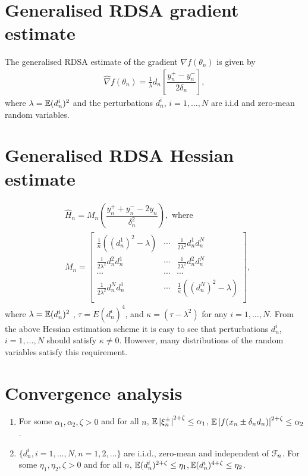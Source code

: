 \section{Generalised RDSA gradient estimate}
The generalised RDSA estimate of the gradient $\nabla f(\theta_n)$ is given by
\begin{align}
\label{eq:grad-gen}
\widehat\nabla f(\theta_n) = \frac1{\lambda} d_n \left[ \dfrac{y_n^+ - y_n^-}{2\delta_n}\right],
\end{align}
where $\lambda = \mathbb{E}(d_n^i)^2 $ and the perturbations $d_n^i$, $i=1,\ldots,N$ are i.i.d and zero-mean random variables. 

\section{Generalised RDSA Hessian estimate}
\begin{align}
\label{eq:2rdsa-estimate-gen}
&\widehat H_n = M_n \left(\dfrac{y_n^+ + y_n^- - 2 y_n}{\delta_n^2}\right), \text{ where }\\
& M_n =
\left[
\begin{array}{ccc}
\frac{1}{\kappa}\left((d_n^1)^2\!-\lambda\right) & \cdots & \frac{1}{2 \lambda^2}d_n^1 d_n^N\\
\frac{1}{2 \lambda^2}d_n^2 d_n^1  &  \cdots & \frac{1}{2 \lambda^2}d_n^2 d_n^N\\
\cdots&\cdots&\cdots\\
\frac{1}{2 \lambda^2}d_n^N d_n^1 & \cdots &  \frac{1}{\kappa}\left((d_n^N)^2-\lambda\right) \\
\end{array}
\right],\nonumber
\end{align}
where $\lambda = \mathbb{E}(d_n^i)^2 $ , $\tau = E (d_n^i)^4$, and $\kappa = \left(\tau - \lambda^2\right)$ for any $i=1,\ldots,N$.
From the above Hessian estimation scheme it is easy to see that perturbations $d_n^i$, $i=1,\ldots,N$ should satisfy  $\kappa \neq 0$. However, many distributions of the random variables satisfy this requirement. 

\section{Convergence analysis}
\label{sec:2rdsa-gen-results}
\begin{enumerate}[label=(\textbf{A\arabic*}),resume]
\item For some $\alpha_1, \alpha_2,\zeta >0$ and for all $n$, 
$\mathbb{E} \left|\xi_n^{\pm}\right|^{2+\zeta} \le \alpha_1$, $\mathbb{E} \left|f(x_n\pm \delta_n d_n)\right|^{2+\zeta} \le \alpha_2$. 
\item $\{d_n^i, i=1,\ldots,N, n=1,2,\ldots\}$ are i.i.d., zero-mean and independent of $\mathcal{F}_n$. For some $\eta_1,\eta_2,\zeta >0$ and for all $n$, $\mathbb{E}(d_n^i)^{2+\zeta} \le \eta_1,\mathbb{E}(d_n^i)^{4+\zeta} \le \eta_2$.
\end{enumerate}


